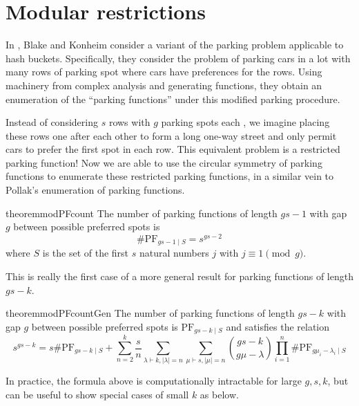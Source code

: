 \documentclass[12 pt]{amsart}
\theoremstyle{definition} %
\theoremstyle{remark} %
\begin{document}
\section{Modular restrictions}

In \cite{blake-konheim-1977}, Blake and Konheim consider a variant of the parking problem applicable to hash buckets.  Specifically, they consider the problem of parking cars in a lot with many rows of parking spot where cars have preferences for the rows. Using machinery from complex analysis and generating functions, they obtain an enumeration of the ``parking functions'' under this modified parking procedure. 

Instead of considering $s$ rows with $g$ parking spots each , we imagine placing these rows one after each other to form a long one-way street and only permit cars to prefer the first spot in each row. This equivalent problem is a restricted parking function! Now we are able to use the circular symmetry of parking functions to enumerate these restricted parking functions, in a similar vein to Pollak's enumeration of parking functions.

\begin{restatable}{theorem}{modPFcount}
	\label{thm:modPFcount}
	The number of parking functions of length $gs - 1$ with gap $g$ between possible preferred spots is
	\[
		\# \mathrm{PF}_{gs - 1 \mid S} = s^{gs - 2}
	\]
	where $S$ is the set of the first $s$ natural numbers $j$ with $j \equiv 1 \pmod g$.
\end{restatable}

This is really the first case of a more general result for parking functions of length $gs - k$.

\begin{restatable}{theorem}{modPFcountGen}
	The number of parking functions of length $gs - k$ with gap $g$ between possible preferred spots is $\mathrm{PF}_{gs - k \mid S}$ and satisfies the relation
	\[
		s^{gs - k} = s \# \mathrm{PF}_{gs - k \mid S} + \sum_{n = 2}^{k} \frac{s}{n} \sum_{\lambda \vdash k, \lvert \lambda \rvert = n} \sum_{\mu \vdash s, \lvert \mu \rvert = n} \binom{gs - k}{g \mu - \lambda} \prod_{i = 1}^{n} \# \mathrm{PF}_{g \mu_{i} - \lambda_{i} \mid S}
	\]
\end{restatable}

In practice, the formula above is computationally intractable for large $g, s, k$, but can be useful to show special cases of small $k$ as below.
\end{document}

